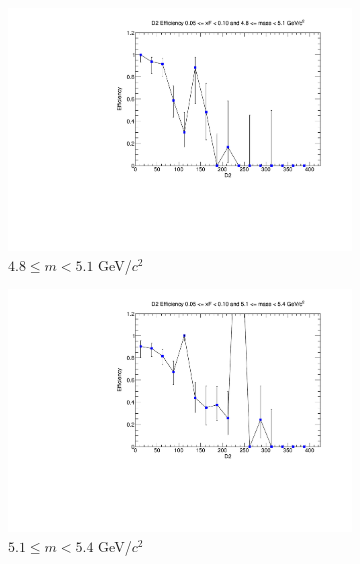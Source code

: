 \begin{figure}[p]
\begin{subfigure}[b]{0.32\textwidth}
        \centering
        \includegraphics[width=\textwidth]{./kTrackerEfficiencyPlots/D2_Efficiency_xF1_mass2.pdf}
        \caption{$4.8 \leq m < 5.1$ GeV/$c^2$}
        \label{fig:xF1_mass2}
    \end{subfigure}
    \vspace{0.5cm}
    \begin{subfigure}[b]{0.32\textwidth}
        \centering
        \includegraphics[width=\textwidth]{./kTrackerEfficiencyPlots/D2_Efficiency_xF1_mass3.pdf}
        \caption{$5.1 \leq m < 5.4$ GeV/$c^2$}
        \label{fig:xF1_mass3}
    \end{subfigure}
    \hfill
    \begin{subfigure}[b]{0.32\textwidth}
        \centering

\end{subfigure}
\end{figure}
